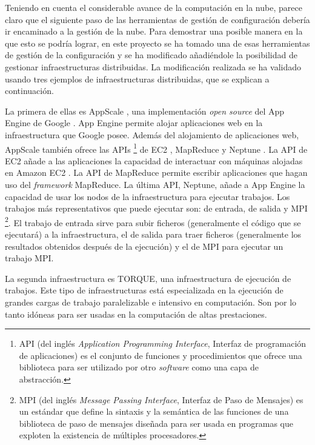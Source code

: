 Teniendo en cuenta el considerable avance de la computación en la nube, parece claro que el siguiente paso de las herramientas de gestión de configuración debería ir encaminado a la gestión de la nube. Para demostrar una posible manera en la que esto se podría lograr, en este proyecto se ha tomado una de esas herramientas de gestión de la configuración y se ha modificado añadiéndole la posibilidad de gestionar infraestructuras distribuidas. La modificación realizada se ha validado usando tres ejemplos de infraestructuras distribuidas, que se explican a continuación.

La primera de ellas es AppScale \cite{appscale}, una implementación \emph{open source} del App Engine de Google \cite{appengine}. App Engine permite alojar aplicaciones web en la infraestructura que Google posee. Además del alojamiento de aplicaciones web, AppScale también ofrece las APIs \footnote[1]{API (del inglés \emph{Application Programming Interface}, Interfaz de programación de aplicaciones) es el conjunto de funciones y procedimientos que ofrece una biblioteca para ser utilizado por otro \emph{software} como una capa de abstracción.} de EC2 \cite{appscale-ec2}, MapReduce \cite{appscale-mapreduce} y Neptune \cite{appscale-neptune}. La API de EC2 añade a las aplicaciones la capacidad de interactuar con máquinas alojadas en Amazon EC2 \cite{amazon-ec2}. La API de MapReduce permite escribir aplicaciones que hagan uso del \emph{framework} MapReduce. La última API, Neptune, añade a App Engine la capacidad de usar los nodos de la infraestructura para ejecutar trabajos. Los trabajos más representativos que puede ejecutar son: de entrada, de salida y MPI \footnote[2]{MPI (del inglés \emph{Message Passing Interface}, Interfaz de Paso de Mensajes) es un estándar que define la sintaxis y la semántica de las funciones de una biblioteca de paso de mensajes diseñada para ser usada en programas que exploten la existencia de múltiples procesadores.}. El trabajo de entrada sirve para subir ficheros (generalmente el código que se ejecutará) a la infraestructura, el de salida para traer ficheros (generalmente los resultados obtenidos después de la ejecución) y el de MPI para ejecutar un trabajo MPI.

La segunda infraestructura es TORQUE, una infraestructura de ejecución de trabajos. Este tipo de infraestructuras está especializada en la ejecución de grandes cargas de trabajo paralelizable e intensivo en computación. Son por lo tanto idóneas para ser usadas en la computación de altas prestaciones.

